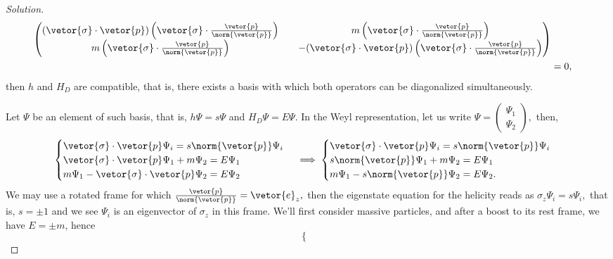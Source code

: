 \begin{proof}[Solution]
\begin{align*}
      \begin{pmatrix}
         (\vetor{\sigma}\cdot \vetor{p})\left(\vetor{\sigma}\cdot\frac{\vetor{p}}{\norm{\vetor{p}}}\right) && m \left(\vetor{\sigma}\cdot\frac{\vetor{p}}{\norm{\vetor{p}}}\right)\\
         m \left(\vetor{\sigma}\cdot\frac{\vetor{p}}{\norm{\vetor{p}}}\right) && - (\vetor{\sigma} \cdot \vetor{p})\left(\vetor{\sigma}\cdot\frac{\vetor{p}}{\norm{\vetor{p}}}\right)
      \end{pmatrix}\\
      &= 0,
   \end{align*}
   then \(h\) and \(H_D\) are compatible, that is, there exists a basis with which both operators can be diagonalized simultaneously.

   Let \(\Psi\) be an element of such basis, that is, \(h \Psi = s \Psi\) and \(H_D \Psi = E \Psi.\) In the Weyl representation, let us write \(\Psi = \left(\begin{smallmatrix}
         \Psi_1\\
         \Psi_2
   \end{smallmatrix}\right),\) then,
   \begin{equation*}
      \begin{cases}
         \vetor{\sigma}\cdot \vetor{p} \Psi_i = s \norm{\vetor{p}} \Psi_i\\
         \vetor{\sigma} \cdot \vetor{p} \Psi_1 + m \Psi_2 = E \Psi_1\\
         m \Psi_1 - \vetor{\sigma} \cdot \vetor{p} \Psi_2 = E \Psi_2
      \end{cases}
      \implies
      \begin{cases}
         \vetor{\sigma}\cdot \vetor{p} \Psi_i = s \norm{\vetor{p}} \Psi_i\\
         s \norm{\vetor{p}} \Psi_1 + m \Psi_2 = E \Psi_1\\
         m \Psi_1 - s \norm{\vetor{p}} \Psi_2 = E \Psi_2.
      \end{cases}
   \end{equation*}
   We may use a rotated frame for which \(\frac{\vetor{p}}{\norm{\vetor{p}}} = \vetor{e}_z,\) then the eigenstate equation for the helicity reads as \(\sigma_z \Psi_i = s \Psi_i,\) that is, \(s = \pm 1\) and we see \(\Psi_i\) is an eigenvector of \(\sigma_z\) in this frame. We'll first consider massive particles, and after a boost to its rest frame, we have \(E = \pm m\), hence
   \begin{equation*}
      \begin{cases}

\end{cases}
\end{equation*}
\end{proof}
